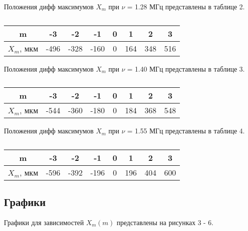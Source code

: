 Положения дифф максимумов $X_m$ при $\nu$ = 1.28 МГц представлены в таблице 2.
\begin{table}[h!]
\begin{center}
    \caption{}
    \begin{tabular}{|c|c|c|c|c|c|c|c|}
    \hline
    m          & -3   & -2   & -1   & 0 & 1   & 2   & 3   \\ \hline
    $X_m$, мкм & -496 & -328 & -160 & 0 & 164 & 348 & 516 \\ \hline
    \end{tabular}
\end{center}
\end{table}

Положения дифф максимумов $X_m$ при $\nu$ = 1.40 МГц представлены в таблице 3.
\begin{table}[h!]
\begin{center}
    \caption{}
    \begin{tabular}{|c|c|c|c|c|c|c|c|}
    \hline
    m          & -3   & -2   & -1   & 0 & 1   & 2   & 3   \\ \hline
    $X_m$, мкм & -544 & -360 & -180 & 0 & 184 & 368 & 548 \\ \hline
    \end{tabular}
\end{center}
\end{table}

Положения дифф максимумов $X_m$ при $\nu$ = 1.55 МГц представлены в таблице 4.
\begin{table}[h!]
\begin{center}
    \caption{}
    \begin{tabular}{|c|c|c|c|c|c|c|c|}
    \hline
    m          & -3   & -2   & -1   & 0 & 1   & 2   & 3   \\ \hline
    $X_m$, мкм & -596 & -392 & -196 & 0 & 196 & 404 & 600 \\ \hline
    \end{tabular}
\end{center}
\end{table}

\newpage

\subsection{Графики}

Графики для зависимостей $X_m(m)$ представлены на рисунках 3 - 6.


